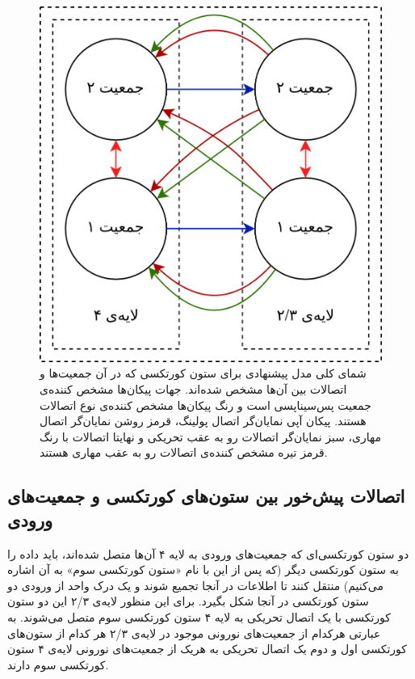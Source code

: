 \documentclass[12pt]{report}
\begin{document}
	\begin{figure}[]
		\centering
		\includegraphics[width=1.0\linewidth]{model_cc.png}
		\caption[NS]{
			شمای کلی مدل پیشنهادی برای ستون کورتکسی که در آن جمعیت‌ها و اتصالات بین آن‌ها مشخص شده‌اند. جهات پیکان‌ها مشخص کننده‌ی جمعیت پس‌سیناپسی است و رنگ پیکان‌ها مشخص کننده‌ی نوع اتصالات هستند. پیکان آپی نمایان‌گر اتصال پولینگ، قرمز روشن نمایان‌گر اتصال مهاری، سبز نمایان‌گر اتصالات رو به عقب تحریکی و نهایتا اتصالات با رنگ قرمز تیره مشخص کننده‌ی اتصالات رو به عقب مهاری هستند.
		}
		\label{fig:model_cc} 
	\end{figure}
	
	
	\subsection{اتصالات پیش‌خور بین ستون‌های کورتکسی و جمعیت‌های ورودی}
	
	دو ستون کورتکسی‌ای که جمعیت‌های ورودی به لایه ۴ آن‌ها متصل شده‌اند، باید داده را به ستون کورتکسی دیگر (که پس از این با نام «ستون کورتکسی سوم» به آن اشاره می‌کنیم) منتقل کنند تا اطلاعات در آنجا تجمیع شوند و یک درک واحد از ورودی دو ستون کورتکسی در آنجا شکل بگیرد. برای این منظور لایه‌ی ۲/۳ این دو ستون کورتکسی با یک اتصال تحریکی به لایه ۴ ستون کورتکسی سوم متصل می‌شوند. به عبارتی هرکدام از جمعیت‌های نورونی موجود در لایه‌ی ۲/۳ هر کدام از ستون‌های کورتکسی اول و دوم یک اتصال تحریکی به هر‌یک از جمعیت‌های نورونی لایه‌ی ۴ ستون کورتکسی سوم دارند. 
	
\end{document}
